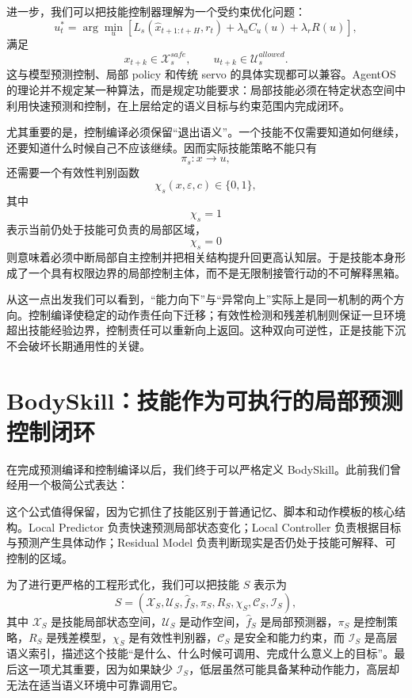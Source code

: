 进一步，我们可以把技能控制器理解为一个受约束优化问题：
\[
u_t^{*}
=
\arg\min_{u}
\left[
L_s
\left(
\hat x_{t+1:t+H},
r_t
\right)
+
\lambda_u C_u(u)
+
\lambda_r R(u)
\right],
\]
满足
\[
x_{t+k}\in\mathcal X_s^{safe},
\qquad
u_{t+k}\in\mathcal U_s^{allowed}.
\]
这与模型预测控制、局部 policy 和传统 servo 的具体实现都可以兼容。AgentOS 的理论并不规定某一种算法，而是规定功能要求：局部技能必须在特定状态空间中利用快速预测和控制，在上层给定的语义目标与约束范围内完成闭环。

尤其重要的是，控制编译必须保留“退出语义”。一个技能不仅需要知道如何继续，还要知道什么时候自己不应该继续。因而实际技能策略不能只有
\[
\pi_s:x\rightarrow u,
\]
还需要一个有效性判别函数
\[
\chi_s(x,\varepsilon,c)
\in
\{0,1\},
\]
其中
\[
\chi_s=1
\]
表示当前仍处于技能可负责的局部区域，
\[
\chi_s=0
\]
则意味着必须中断局部自主控制并把相关结构提升回更高认知层。于是技能本身形成了一个具有权限边界的局部控制主体，而不是无限制接管行动的不可解释黑箱。

从这一点出发我们可以看到，“能力向下”与“异常向上”实际上是同一机制的两个方向。控制编译使稳定的动作责任向下迁移；有效性检测和残差机制则保证一旦环境超出技能经验边界，控制责任可以重新向上返回。这种双向可逆性，正是技能下沉不会破坏长期通用性的关键。

\section{BodySkill：技能作为可执行的局部预测控制闭环}

在完成预测编译和控制编译以后，我们终于可以严格定义 BodySkill。此前我们曾经用一个极简公式表达：
\begin{statementbox}
\centering
{}
\end{statementbox}
这个公式值得保留，因为它抓住了技能区别于普通记忆、脚本和动作模板的核心结构。Local Predictor 负责快速预测局部状态变化；Local Controller 负责根据目标与预测产生具体动作；Residual Model 负责判断现实是否仍处于技能可解释、可控制的区域。

为了进行更严格的工程形式化，我们可以把技能 $S$ 表示为
\[
S
=
\left(
\mathcal X_S,
\mathcal U_S,
\hat f_S,
\pi_S,
R_S,
\chi_S,
\mathcal C_S,
\mathcal I_S
\right),
\]
其中 $\mathcal X_S$ 是技能局部状态空间，$\mathcal U_S$ 是动作空间，$\hat f_S$ 是局部预测器，$\pi_S$ 是控制策略，$R_S$ 是残差模型，$\chi_S$ 是有效性判别器，$\mathcal C_S$ 是安全和能力约束，而 $\mathcal I_S$ 是高层语义索引，描述这个技能“是什么、什么时候可调用、完成什么意义上的目标”。最后这一项尤其重要，因为如果缺少 $\mathcal I_S$，低层虽然可能具备某种动作能力，高层却无法在适当语义环境中可靠调用它。

